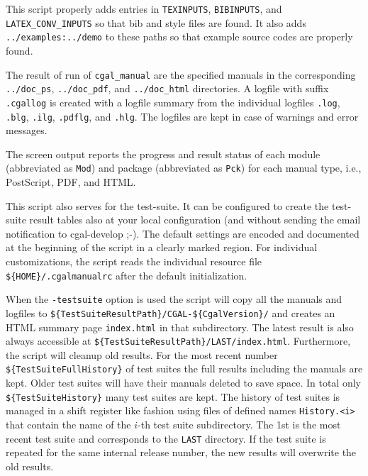 This script properly adds entries in \texttt{TEXINPUTS},
\texttt{BIBINPUTS}, and \texttt{LATEX\_CONV\_INPUTS} so that bib and
style files are found. It also adds \texttt{../examples:../demo} to
these paths so that example source codes are properly found.

The result of run of \texttt{cgal\_manual} are the specified manuals
in the corresponding \texttt{../doc\_ps}, \texttt{../doc\_pdf}, and
\texttt{../doc\_html} directories. A logfile with suffix
\texttt{.cgallog} is created with a logfile summary from the
individual logfiles \texttt{.log}, \texttt{.blg}, \texttt{.ilg},
\texttt{.pdflg}, and \texttt{.hlg}. The logfiles are kept in case of
warnings and error messages.

The screen output reports the progress and result status of each
module (abbreviated as \texttt{Mod}) and package (abbreviated as
\texttt{Pck}) for each manual type, i.e., PostScript, PDF, and HTML.

This script also serves for the test-suite. It can be configured to
create the test-suite result tables also at your local configuration
(and without sending the email notification to cgal-develop ;-).
The default settings are encoded and documented at the beginning of
the script in a clearly marked region. For individual customizations,
the script reads the individual resource file
\verb|${HOME}/.cgalmanualrc| after the default initialization.

When the \texttt{-testsuite} option is used the script will copy all
the manuals and logfiles to
\verb|${TestSuiteResultPath}/CGAL-${CgalVersion}/| and creates an HTML
summary page \texttt{index.html} in that subdirectory. The latest
result is also always accessible at
\verb|${TestSuiteResultPath}/LAST/index.html|.  Furthermore, the
script will cleanup old results. For the most recent number
\verb|${TestSuiteFullHistory}| of test suites the full results
including the manuals are kept. Older test suites will have their
manuals deleted to save space. In total only
\verb|${TestSuiteHistory}| many test suites are kept.  The history of
test suites is managed in a shift register like fashion using files of
defined names \texttt{History.<i>} that contain the name of the $i$-th
test suite subdirectory. The 1st is the most recent test suite and
corresponds to the \texttt{LAST} directory.  If the test suite is
repeated for the same internal release number, the new results will
overwrite the old results.


